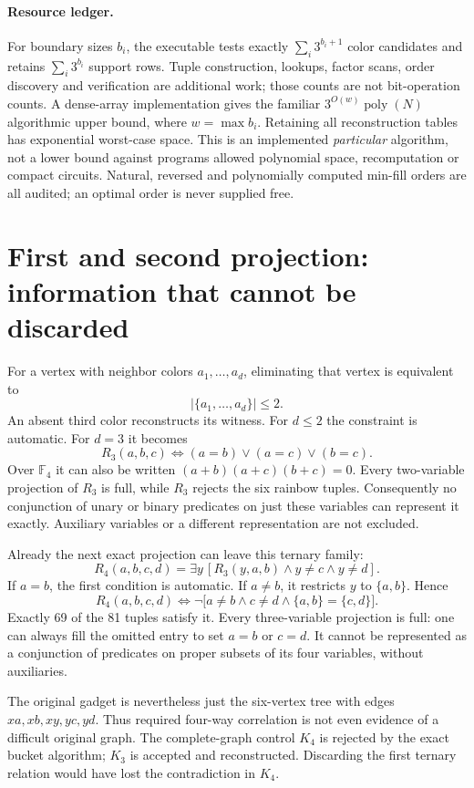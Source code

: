 \documentclass[11pt]{article}
\newcommand{\F}{\mathbb F}
\begin{document}
\paragraph{Resource ledger.}
For boundary sizes $b_i$, the executable tests exactly
$\sum_i3^{b_i+1}$ color candidates and retains $\sum_i3^{b_i}$ support rows.
Tuple construction, lookups, factor scans, order discovery and verification
are additional work; those counts are not bit-operation counts. A dense-array
implementation gives the familiar $3^{O(w)}\operatorname{poly}(N)$ algorithmic
upper bound, where $w=\max b_i$. Retaining all reconstruction tables has
exponential worst-case space. This is an implemented \emph{particular}
algorithm, not a lower bound against programs allowed polynomial space,
recomputation or compact circuits. Natural, reversed and polynomially computed
min-fill orders are all audited; an optimal order is never supplied free.

\section{First and second projection: information that cannot be discarded}
For a vertex with neighbor colors $a_1,\ldots,a_d$, eliminating that vertex
is equivalent to
\[
 |\{a_1,\ldots,a_d\}|\le2.
\]
An absent third color reconstructs its witness. For $d\le2$ the constraint
is automatic. For $d=3$ it becomes
\[
 R_3(a,b,c)\iff (a=b)\lor(a=c)\lor(b=c).
\]
Over $\F_4$ it can also be written
$(a+b)(a+c)(b+c)=0$. Every two-variable projection of $R_3$ is full, while
$R_3$ rejects the six rainbow tuples. Consequently no conjunction of unary
or binary predicates on just these variables can represent it exactly.
Auxiliary variables or a different representation are not excluded.

Already the next exact projection can leave this ternary family:
\[
 R_4(a,b,c,d)=\exists y\,[R_3(y,a,b)\land y\ne c\land y\ne d].
\]
If $a=b$, the first condition is automatic. If $a\ne b$, it restricts
$y$ to $\{a,b\}$. Hence
\begin{equation}\label{eq:r4}
 R_4(a,b,c,d)\iff
 \neg\bigl[a\ne b\land c\ne d\land\{a,b\}=\{c,d\}\bigr].
\end{equation}
Exactly 69 of the 81 tuples satisfy it. Every three-variable projection is
full: one can always fill the omitted entry to set $a=b$ or $c=d$.
It cannot be represented as a conjunction of predicates on proper subsets
of its four variables, without auxiliaries.

The original gadget is nevertheless just the six-vertex tree with edges
$xa,xb,xy,yc,yd$. Thus required four-way correlation is not even evidence of
a difficult original graph. The complete-graph control $K_4$ is rejected by
the exact bucket algorithm; $K_3$ is accepted and reconstructed. Discarding
the first ternary relation would have lost the contradiction in $K_4$.
\end{document}
